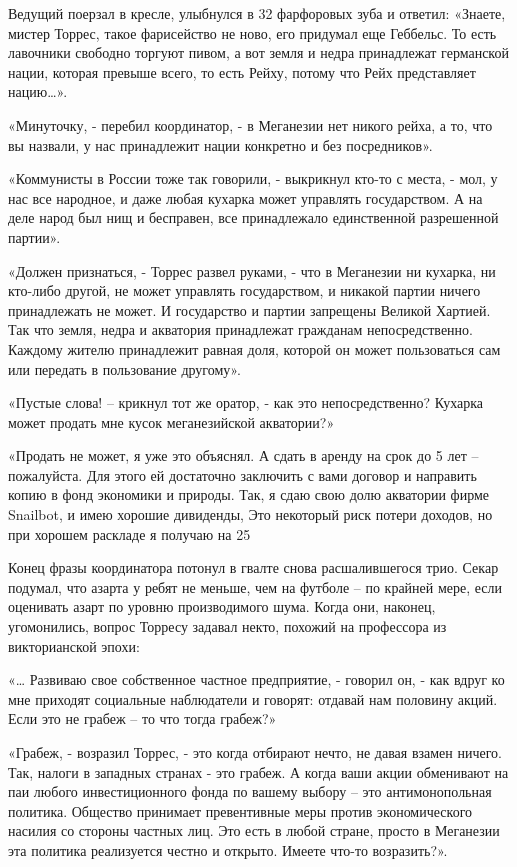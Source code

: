 \documentclass[10pt,final]{book}
\begin{document}
Ведущий поерзал в кресле, улыбнулся в 32 фарфоровых зуба и ответил: «Знаете, мистер Торрес, такое фарисейство не ново, его придумал еще Геббельс. То есть лавочники свободно торгуют пивом, а вот земля и недра принадлежат германской нации, которая превыше всего, то есть Рейху, потому что Рейх представляет нацию\ldots{}».

«Минуточку, - перебил координатор, - в Меганезии нет никого рейха, а то, что вы назвали, у нас принадлежит нации конкретно и без посредников».

«Коммунисты в России тоже так говорили, - выкрикнул кто-то с места, - мол, у нас все народное, и даже любая кухарка может управлять государством. А на деле народ был нищ и бесправен, все принадлежало единственной разрешенной партии».

«Должен признаться, - Торрес развел руками, - что в Меганезии ни кухарка, ни кто-либо другой, не может управлять государством, и никакой партии ничего принадлежать не может. И государство и партии запрещены Великой Хартией. Так что земля, недра и акватория принадлежат гражданам непосредственно. Каждому жителю принадлежит равная доля, которой он может пользоваться сам или передать в пользование другому».

«Пустые слова! -- крикнул тот же оратор, - как это непосредственно? Кухарка может продать мне кусок меганезийской акватории?»

«Продать не может, я уже это объяснял. А сдать в аренду на срок до 5 лет -- пожалуйста. Для этого ей достаточно заключить с вами договор и направить копию в фонд экономики и природы. Так, я сдаю свою долю акватории фирме Snailbot, и имею хорошие дивиденды, Это некоторый риск потери доходов, но при хорошем раскладе я получаю на 25%

Конец фразы координатора потонул в гвалте снова расшалившегося трио. Секар подумал, что азарта у ребят не меньше, чем на футболе -- по крайней мере, если оценивать азарт по уровню производимого шума. Когда они, наконец, угомонились, вопрос Торресу задавал некто, похожий на профессора из викторианской эпохи:

«\ldots{} Развиваю свое собственное частное предприятие, - говорил он, - как вдруг ко мне приходят социальные наблюдатели и говорят: отдавай нам половину акций. Если это не грабеж -- то что тогда грабеж?»

«Грабеж, - возразил Торрес, - это когда отбирают нечто, не давая взамен ничего. Так, налоги в западных странах - это грабеж. А когда ваши акции обменивают на паи любого инвестиционного фонда по вашему выбору -- это антимонопольная политика. Общество принимает превентивные меры против экономического насилия со стороны частных лиц. Это есть в любой стране, просто в Меганезии эта политика реализуется честно и открыто. Имеете что-то возразить?».
\end{document}
